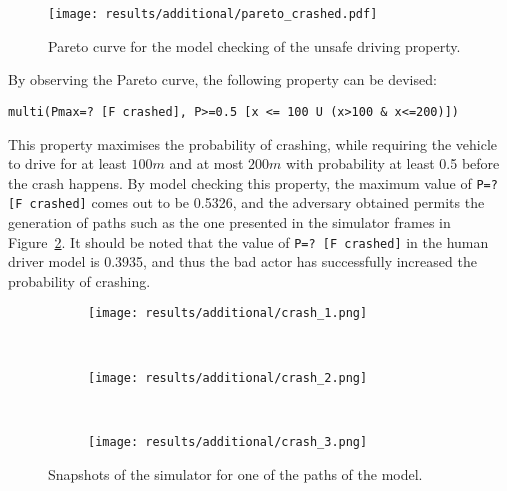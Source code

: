 \begin{figure}[H]
\centering
\texttt{[image: results/additional/pareto\_crashed.pdf]}
\caption{Pareto curve for the model checking of the unsafe driving property.}
\label{fig:unsafe_pareto}
\end{figure}

By observing the Pareto curve, the following property can be devised:

\begin{minipage}{\linewidth}
{\vspace{1em}
\begin{lstlisting}
multi(Pmax=? [F crashed], P>=0.5 [x <= 100 U (x>100 & x<=200)])
\end{lstlisting}
}
\end{minipage}

This property maximises the probability of crashing, while requiring the vehicle to drive for at least $100m$ and at most $200m$ with probability at least 0.5 before the crash happens. By model checking this property, the maximum value of \texttt{P=? [F crashed]} comes out to be 0.5326, and the adversary obtained permits the generation of paths such as the one presented in the simulator frames in Figure~\ref{fig:unsafe_sim}. It should be noted that the value of \texttt{P=? [F crashed]} in the human driver model is 0.3935, and thus the bad actor has successfully increased the probability of crashing. 

\vspace{1em}
\begin{figure}[H]
\centering
\begin{subfigure}{0.75\textwidth}
  \centering
  \texttt{[image: results/additional/crash\_1.png]}
\end{subfigure}\\ \vspace{2px}
\begin{subfigure}{0.75\textwidth}
  \centering
  \texttt{[image: results/additional/crash\_2.png]}
\end{subfigure} \\ \vspace{2px}
\begin{subfigure}{0.75\textwidth}
  \centering
  \texttt{[image: results/additional/crash\_3.png]}
\end{subfigure}
\caption{Snapshots of the simulator for one of the paths of the model.}
\label{fig:unsafe_sim}
\end{figure}











